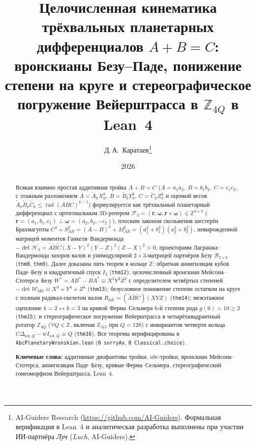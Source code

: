 \documentclass[11pt,a4paper]{article}
\title{\textbf{Целочисленная кинематика трёхвальных планетарных дифференциалов $A + B = C$:\\ вронскианы Безу--Паде, понижение степени на круге и стереографическое погружение Вейерштрасса в $\mathbb{Z}_{4Q}$ в Lean~4}}
\author{Д.\,А.~Каратаев\thanks{AI-Guiders Research (\url{https://github.com/AI-Guiders}). Формальная верификация в Lean~4 и аналитическая разработка выполнены при участии ИИ-партнёра \emph{Луч} (\emph{Luch}, AI-Guiders).}}
\date{2026}
\theoremstyle{plain}
\theoremstyle{definition}
\begin{document}
\maketitle

\begin{abstract}
Всякая взаимно простая аддитивная тройка $A + B = C$ ($A = a_1 a_2,\ B = b_1 b_2,\ C = c_1 c_2$, с этажным разложением $A = \widetilde{A}_k X_k^k,\ B = \widetilde{B}_k Y_k^k,\ C = \widetilde{C}_k Z_k^k$ и оценкой весов $\widetilde{A}_k\widetilde{B}_k\widetilde{C}_k \le \operatorname{rad}(ABC)^{k-1}$) формулируется как трёхвальный планетарный дифференциал с ортогональным $3\mathrm{D}$-репером $\mathcal{F}_3 = (\mathbf{r},\mathbf{\omega},\mathbf{r}\times\mathbf{\omega})\in\mathbb{Z}^{3\times 3}$ ($\mathbf{r} = (a_1,b_1,c_1)\perp\mathbf{\omega} = (a_2,b_2,-c_2)$), плоским законом скольжения шестерён Брахмагупты $C^2 + S_{AB}^2 = (A-B)^2 + M_{AB}^2 = (a_1^2+b_1^2)(a_2^2+b_2^2)$, невырожденной матрицей моментов Ганкеля--Вандермонда $-\det\mathcal{H}_3 = \widetilde{A}\widetilde{B}\widetilde{C}(X-Y)^2(Y-Z)^2(Z-X)^2 > 0$, проекторами Лагранжа--Вандермонда зазоров валов и унимодулярной $2\times 3$-матрицей партнёров Безу $\mathcal{B}_{2\times 3}$ (\texttt{thm8}, \texttt{thm9}). Далее доказаны пять теорем в кольце $\mathbb{Z}$: обратная аннигиляция кубов Паде--Безу и квадратичный спуск $I_2$ (\texttt{thm12}); целочисленный вронскиан Мейсона--Стотерса--Безу $W^* = A B^* - B A^* \equiv X^2 Y^2 Z^2$ с определителем четвёртых степеней $-\det\mathcal{W}_{\mathrm{MS}} \equiv X^4 + Y^4 + Z^4$ (\texttt{thm13}); безусловное понижение степени остатком на круге с полным радикал-скелетом валов $R_{\mathrm{full}} = (\widetilde{A}\widetilde{B}\widetilde{C})(X Y Z)$ (\texttt{thm14}); межэтажное сцепление $k=2\leftrightarrow k=3$ на кривой Ферма--Сельмера 6-й степени рода $g(6)=10\ge 2$ (\texttt{thm15}); и стереографическое погружение Вейерштрасса в четырёхквадрантный ротатор $\mathbb{Z}_{4Q}$ ($\forall Q\in\mathbb{Z}$, включая $\mathbb{Z}_{512}$ при $Q=128$) с инвариантом четверти кольца $C\Delta_{\mathrm{rot},Q} - w I_{\mathrm{rot},Q} \equiv Q$ (\texttt{thm16}). Все теоремы верифицированы в \texttt{AbcPlanetaryWronskian.lean} (\texttt{0 sorryAx}, \texttt{0 Classical.choice}).

\medskip\noindent
\textbf{Ключевые слова:} аддитивные диофантовы тройки, $abc$-тройки, вронскиан Мейсона--Стотерса, аннигиляция Паде--Безу, кривые Ферма--Сельмера, стереографический гомеоморфизм Вейерштрасса, Lean~4.
\end{abstract}
\end{document}
